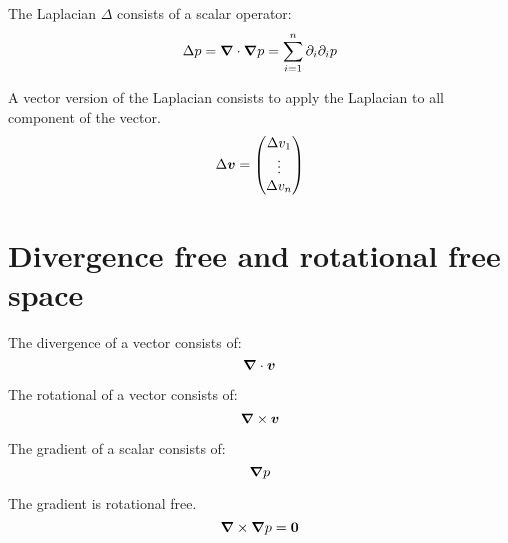 \begin{definition}[Laplacian]
The Laplacian $\Delta$ consists of a scalar operator:
\begin{equation}
\Delta p={\boldsymbol {\nabla}}\cdot {\boldsymbol {\nabla}}p=\sum_{i=1}^{n} \partial_{i}\partial_{i}p
\end{equation}
\end{definition}

\begin{definition}
A vector version of the Laplacian consists to apply the Laplacian to all component of the vector.
\begin{equation}
 \Delta {\boldsymbol {v}}=\begin{pmatrix} \Delta v_{1}\\
                  \vdots\\ \Delta v_{n}
                 \end{pmatrix}
\end{equation}
\end{definition}
\section{Divergence free and rotational free space}

\begin{definition}[Divergence]
 The divergence of a vector consists of:
 \begin{equation}
  {\boldsymbol {\nabla}} \cdot {\boldsymbol {v}}
  \end{equation}
\end{definition}

\begin{definition}[Rotational]
 The rotational of a vector consists of:
 \begin{equation}
  {\boldsymbol {\nabla}} \times {\boldsymbol {v}}
 \end{equation}
\end{definition}

\begin{definition}[Gradient]
 The gradient of a scalar consists of:
 \begin{equation}
  {\boldsymbol {\nabla}} p
 \end{equation}
\end{definition}

\begin{property}
 The gradient is rotational free.
 \begin{equation}
  {\boldsymbol {\nabla}}\times {\boldsymbol {\nabla}} p={\boldsymbol {0}}
 \end{equation}
\end{property}

